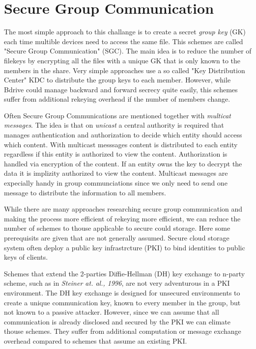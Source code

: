 \section{Secure Group Communication}
The most simple approach to this challange is to create a secret \textit{group key} (GK) each time multible devices need to access the same file. This schemes are called "Secure Group Communication" (SGC). The main idea is to reduce the number of filekeys by encrypting all the files with a unique GK that is only known to the members in the share. Very simple approaches use a so called "Key Distribution Center" KDC to distribute the group keys to each member. However, while Bdrive could manage backward and forward secrecy quite easily, this schemes suffer from additional rekeying overhead if the number of members change. 

Often Secure Group Communications are mentioned together with \textit{multicat messages}. The idea is that on \textit{unicast} a central authority is required that manages authentication and authorization to decide which entity should access which content. With multicast messsages content is distributed to each entity regardless if this entity is authorized to view the content. Authorization is handled via encryption of the content. If an entity owns the key to decrypt the data it is implizity authorized to view the content. Multicast messages are expecially handy in group communciations since we only need to send one message to distribute the information to all members. 

While there are many approaches researching secure group communication and making the process more efficient of rekeying more efficient, we can reduce the number of schemes to thouse applicable to secure could storage. Here some prerequisits are given that are not generally assumed. Secure cloud storage system often deploy a public key infrastrcture (PKI) to bind identities to public keys of clients.

Schemes that extend the 2-parties Diffie-Hellman (DH) key exchange to n-party scheme, such as in \textit{Steiner at. al., 1996}\cite{steiner1996diffie}, are not very adventurous in a PKI environment. The DH key exchange is designed for unsecured environments to create a unique communication key, known to every member in the group, but not known to a passive attacker. However, since we can assume that all communication is already disclosed and secured by the PKI we can elimate thouse schemes. They suffer from additional computation or message exchange overhead compared to schemes that assume an existing PKI.   

